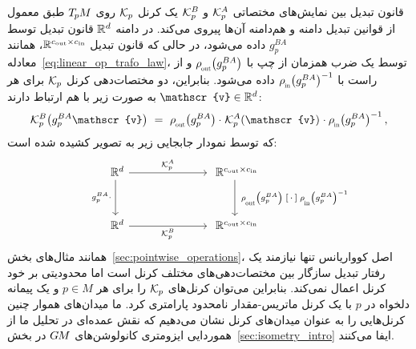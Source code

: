قانون تبدیل بین نمایش‌های مختصاتی $\mathcal{K}_p^A$ و $\mathcal{K}_p^B$ یک کرنل $\mathcal{K}_p$ روی $T_{\mkern-1.5mu p}\mkern-.5muM$ طبق معمول از قوانین تبدیل دامنه و هم‌دامنه آن‌ها پیروی می‌کند.
در دامنه $\mathbb{R}^d$ قانون تبدیل توسط $g_p^{BA}$ داده می‌شود، در حالی که قانون تبدیل $\mathbb{R}^{{c_\textup{out}}\times{c_\textup{in}}}$، همانند معادله~\eqref{eq:linear_op_trafo_law}، توسط یک ضرب همزمان از چپ با $\rhoout\big(g_p^{BA}\big)$ و از راست با $\rhoin\big(g_p^{BA}\big)^{-1}$ داده می‌شود.
بنابراین، دو مختصات‌دهی کرنل $\mathcal{K}_p$ برای هر $\mathscr{v} \in \R^d$ به صورت زیر با هم ارتباط دارند:
\begin{align}\label{eq:kernel_trafo_law}
	\Kp^B\big(g_p^{BA} \mathscr{v}\big)\ =\ 
	\rhoout\big(g_p^{BA}\big) \cdot\mkern1mu 
	\Kp^A (\mathscr{v})
	\mkern1mu\cdot \rhoin\big(g_p^{BA}\big)^{-1} \,,
\end{align}
که توسط نمودار جابجایی زیر به تصویر کشیده شده است:
\begin{equation}\label{cd:kernel_trafo_law}
	\qquad
	\begin{tikzcd}[column sep=70pt, row sep=32pt, font=\normalsize]
		\R^d
		\arrow[d, "g_p^{BA} \cdot\,"']
		\arrow[r, "\Kp^A"]
		&
		\R^{\cout\times\cin}
		\arrow[d, "\ \rhoout\big(g_p^{BA}\big) \; \scalebox{1.1}{$[\,\cdot\,]$} \; \rhoin\big(g_p^{BA}\big)^{-1}"]
		\\
		\R^d
		\arrow[r, "\Kp^B"']
		&
		\R^{\cout\times\cin}
	\end{tikzcd}
\end{equation}
همانند مثال‌های بخش~\ref{sec:pointwise_operations}، اصل کوواریانس تنها نیازمند یک رفتار تبدیل سازگار بین مختصات‌دهی‌های مختلف کرنل است اما محدودیتی بر خود کرنل اعمال نمی‌کند.
بنابراین می‌توان کرنل‌های $\mathcal{K}_p$ را برای هر $p\in M$ و یک پیمانه دلخواه در $p$ با یک کرنل ماتریس-مقدار نامحدود پارامتری کرد.
ما میدان‌های هموار چنین کرنل‌هایی را به عنوان میدان‌های کرنل نشان می‌دهیم که نقش عمده‌ای در تحلیل ما از هموردایی ایزومتری کانولوشن‌های $G\mkern-1.4muM$ در بخش~\ref{sec:isometry_intro} ایفا می‌کنند.



